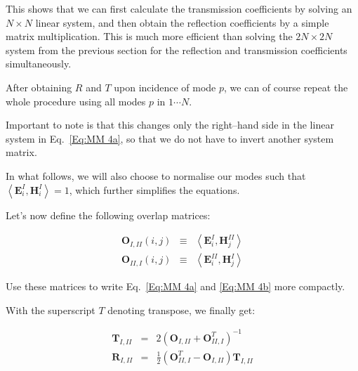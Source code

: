 This shows that we can first calculate the transmission coefficients by solving an $N \times N$ linear system, and then obtain the reflection coefficients by a simple matrix multiplication. This is much more efficient than solving the $2N \times 2N$ system from the previous section for the reflection and transmission coefficients simultaneously.

After obtaining $R$ and $T$ upon incidence of mode $p$, we can of course repeat the whole procedure using all modes $p$ in $ 1 \cdots N$.

\noindent{}Important to note is that this changes only the right--hand side in the linear system in Eq.~\ref{Eq:MM 4a}, so that we do not have to invert another system matrix. 

In what follows, we will also choose to normalise our modes such that \( \left\langle \mathbf{E}^{I}_{i},\mathbf{H}^{I}_{i}\right\rangle =1 \), which further simplifies the equations.

\pagebreak


Let's now define the following overlap matrices:

\begin{eqnarray}
\mathbf{O}_{I,II}\left( i,j\right)  & \equiv  & \left\langle \mathbf{E}^{I}_{i},\mathbf{H}^{II}_{j}\right\rangle \label{Eq:O_I_II} \\
\mathbf{O}_{II,I}\left( i,j\right)  & \equiv  & \left\langle \mathbf{E}^{II}_{i},\mathbf{H}^{I}_{j}\right\rangle \label{Eq:O_II_I} 
\end{eqnarray}

\begin{cue}
Use these matrices to write Eq.~\ref{Eq:MM 4a} and \ref{Eq:MM 4b} more compactly.   
\end{cue}

With the superscript $T$ denoting transpose, we finally get:

\begin{eqnarray}
\mathbf{T}_{I,II} & = & 2\left( \mathbf{O}_{I,II}+\mathbf{O}^{T}_{II,I}\right) ^{-1}\label{Eq:MM 5a} \\
\mathbf{R}_{I,II} & = & \frac{1}{2}\left( \mathbf{O}^{T}_{II,I}-\mathbf{O}_{I,II}\right)  \mathbf{T}_{I,II}\label{Eq:MM 5b} 
\end{eqnarray}

